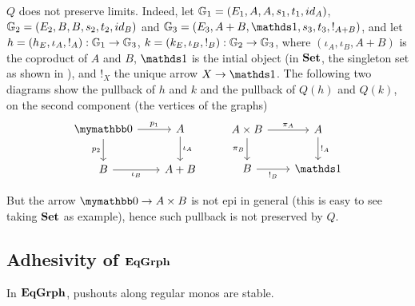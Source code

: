 {\color{blue}
\begin{example}
	$Q$ does not preserve limits. Indeed, let $\mathbb{G}_1 = (E_1, A, A, s_1, t_1, id_A)$, $\mathbb{G}_2 = (E_2, B, B, s_2, t_2, id_B)$ and $\eqgraph{G}_3 = (E_3, A + B, \terminal, s_3, t_3, !_{A + B})$, and let $h = (h_E, \iota_A, !_A): \mathbb{G}_1 \to \mathbb{G}_3$, $k = (k_E, \iota_B, !_B): \mathbb{G}_2 \to \mathbb{G}_3$, where $(\iota_A, \iota_B, A + B)$ is the coproduct of $A$ and $B$, $\terminal$ is the intial object (in $\mathbf{Set}$, the singleton set as shown in ), and $!_X$ the unique arrow $X \to \terminal$.
	The following two diagrams show the pullback of $h$ and $k$ and the pullback of $Q(h)$ and $Q(k)$, on the second component (the vertices of the graphs)
	\[\begin{tikzcd}[row sep = 20, column sep = 20]
		\initial \ar[r, "{p_1}"] \ar[d, "{p_2}" swap] & A \ar[d, "{\iota_A}"] \\
		B \ar[r, "{\iota_B}"swap] & A+B
	\end{tikzcd}\
	\qquad
	\begin{tikzcd}[row sep = 20, column sep = 20]
		{A \times B} \ar[r, "{\pi_A}"] \ar[d, "{\pi_B}"swap] & A \ar[d, "{!_A}"] \\
		B \ar[r, "{!_B}"swap] & \terminal
	\end{tikzcd}\]

	But the arrow $\initial \to A\times B$ is not epi in general (this is easy to see taking $\mathbf{Set}$ as example), hence such pullback is not preserved by $Q$.
\end{example}
}

\subsection{Adhesivity of $\mathbf{EqGrph}$}

\begin{lemma}\label{lemma:stab}
	In $\mathbf{EqGrph}$, pushouts along regular monos are stable.
\end{lemma}

